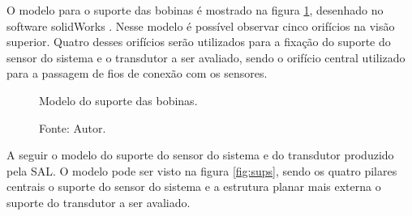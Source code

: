 O modelo para o suporte das bobinas é mostrado na figura \ref{fig:mod3D}, desenhado no software solidWorks \cite{solidWorks}. Nesse modelo é possível observar cinco orifícios na visão superior. Quatro desses orifícios serão utilizados para a fixação do suporte do sensor do sistema e o transdutor a ser avaliado, sendo o orifício central utilizado para a passagem de fios de conexão com os sensores.


\begin{figure}[H]
    \centering
     \caption{Modelo do suporte das bobinas.}
     \caption*{Fonte: Autor.}\label{fig:mod3D}
\end{figure}

A seguir o modelo do suporte do sensor do sistema e do transdutor produzido pela SAL. O modelo pode ser visto na figura \ref{fig:sups}, sendo os quatro pilares centrais o suporte do sensor do sistema e a estrutura planar mais externa o suporte do transdutor a ser avaliado.

